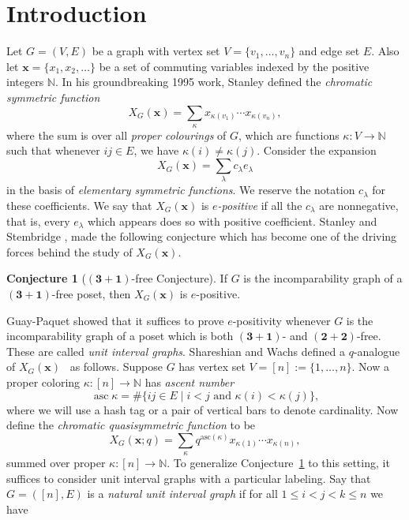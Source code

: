 \documentclass[12pt]{amsart}  %
\theoremstyle{definition}
\newtheorem{conjecture}[theorem]{Conjecture}
\theoremstyle{remark}
\numberwithin{equation}{section}
\newcommand{\ka}{\kappa}
\newcommand{\la}{\lambda}
\newcommand{\bx}{\bm x}
\DeclareMathOperator{\asc}{asc}
\begin{document}
\section{Introduction}\label{section:introduction}
Let $G=(V,E)$ be a graph with vertex set $V=\{v_1,\ldots,v_n\}$ and edge set $E$.
Also let $\bm x=\{x_1,x_2,\ldots\}$ be a set of commuting variables indexed by the positive integers $\mathbb N$.
In his groundbreaking 1995 work, Stanley defined the \emph{chromatic symmetric function} \cite[Definition 2.1]{chromsym}
$$
X_G(\bm x)=\sum_\kappa x_{\kappa(v_1)}\cdots x_{\kappa(v_n)},
$$
where the sum is over all \emph{proper colourings} of $G$, which are functions $\kappa:V\to\mathbb N$ such that whenever $ij\in E$, we have $\kappa(i)\neq\kappa(j)$. Consider the expansion 
\begin{equation}
\label{c_la}
X_G(\bm x)=\sum_\lambda c_\lambda e_\lambda
\end{equation}
in the basis of \emph{elementary symmetric functions}. 
We reserve the notation $c_\la$ for these coefficients.
We say that $X_G(\bx)$ is \emph{$e$-positive} if all the $c_\la$ are nonnegative, that is, every $e_\la$ which appears does so with positive coefficient.
Stanley and Stembridge  \cite[Conjecture 5.1]{chromsym}, \cite[Conjecture 5.5]{stanstem} made the following conjecture which has become one of the driving forces behind the study of $X_G(\bx)$.
\begin{conjecture}[$(\bm 3+\bm 1)$-free Conjecture]
\label{SSconj}
 If $G$ is the incomparability graph of a $(\bm 3+\bm 1)$-free poset, 
 then $X_G(\bm x)$ is $e$-positive.
\end{conjecture}
Guay-Paquet \cite[Theorem 5.1]{stanstemreduction} showed that it suffices to prove $e$-positivity whenever $G$ is the incomparability graph of a 
poset which is both $(\bm 3+\bm 1)$- and $(\bm 2+\bm 2)$-free.  These are called {\em unit interval graphs}. Shareshian and Wachs defined a $q$-analogue of $X_G(\bm x)$~\cite[Definition 1.2]{chromposquasi} as follows.
Suppose $G$ has vertex set $V=[n]:=\{1,\ldots,n\}$.  Now a proper coloring 
$\ka:[n]\rightarrow\mathbb N$ has {\em ascent number}
$$
\asc\ka = \#\{ ij \in E \mid i<j \text{ and } \ka(i)<\ka(j)\},
$$
where we will use a hash tag or a pair of vertical bars to denote cardinality.  Now define the \emph{chromatic quasisymmetric function} to be
$$
X_G(\bm x;q)=\sum_\kappa q^{\text{asc}(\kappa)}x_{\kappa(1)}\cdots x_{\kappa(n)},
$$
summed over proper $\ka:[n]\rightarrow\mathbb N$.
To generalize Conjecture~\ref{SSconj} to this setting, it suffices to consider unit interval graphs with a particular labeling.  Say that $G=([n],E)$ is a {\em natural unit interval graph}  if for all $1\leq i<j<k\leq n$ we have
\end{document}
